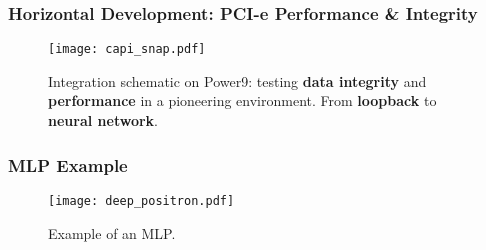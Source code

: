 

\begin{frame}
    \frametitle{Horizontal Development: PCI-e Performance \& Integrity}


            \begin{figure}
                \centering
                \texttt{[image: capi\_snap.pdf]}
		    \caption{Integration schematic on Power9: testing \textbf{data integrity} and \textbf{performance} in a pioneering environment. From \textbf{loopback} to \textbf{neural network}.}
                \label{fig:capi_snap}
            \end{figure}

    \note[item]{}
\end{frame}

\begin{frame}
    \frametitle{MLP Example}
    \begin{figure}[H]
        \centering
        \texttt{[image: deep\_positron.pdf]}
        \caption{Example of an MLP.}
    \end{figure}
\end{frame}

